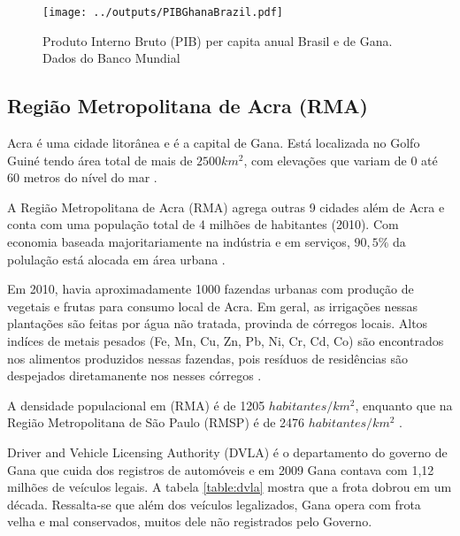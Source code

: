 \begin{figure}[H]
\begin{center}
  \texttt{[image: ../outputs/PIBGhanaBrazil.pdf]}
  \caption{Produto Interno Bruto (PIB) per capita anual Brasil e de Gana. 
           Dados do Banco Mundial \citep{bancomundial} \label{fg:pib}}
\end{center}
\end{figure}


\subsection{Região Metropolitana de Acra (RMA)}

Acra é uma cidade litorânea e é a capital de Gana. Está localizada 
no Golfo Guiné tendo área total de mais de  $2500 km^2$, com elevações que 
variam de 0 até 60 metros do nível do mar \citep{ARKU2008}.

A Região Metropolitana de Acra (RMA) agrega outras 9 cidades
além de Acra e conta com uma população total de 4 milhões de habitantes (2010). 
Com economia baseada majoritariamente na indústria e em serviços, 
$90,5\%$ da polulação está alocada em área urbana \citep{ghanacensus2013}.


Em 2010, havia aproximadamente 1000 fazendas urbanas com produção de vegetais e
frutas para consumo local de Acra. Em geral, as irrigações nessas plantações
são feitas por água não tratada, provinda de córregos locais. 
Altos indíces de metais pesados (Fe, Mn, Cu, Zn, Pb, Ni, Cr, Cd, Co)
são encontrados nos alimentos produzidos nessas fazendas, pois resíduos de
residências são despejados diretamanente nos nesses córregos \citep{lente2014}.

A densidade populacional em (RMA) é de 1205 $habitantes/km^2$, 
enquanto que na Região Metropolitana de São Paulo (RMSP) é de 
2476 $habitantes/km^2$ \citep{ibge2011}. 

Driver and Vehicle Licensing Authority (DVLA) é o
departamento do governo de Gana que cuida dos registros de automóveis
e em 2009 Gana contava com 1,12 milhões de veículos legais. 
A tabela \ref{table:dvla} mostra que a frota dobrou em um década.
Ressalta-se que além dos veículos legalizados, Gana opera com frota velha e 
mal conservados, muitos dele não registrados pelo Governo. 

